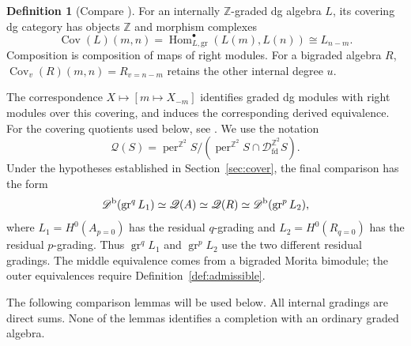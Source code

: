\documentclass[12pt,a4paper,english,reqno]{amsart}
\theoremstyle{plain}
\theoremstyle{definition}
\newtheorem{dfn*}[thm]{Definition}
\numberwithin{equation}{section}
\def\Hom{\operatorname{Hom}}
\def\Db{{\mathcal D}^{\text{\rm b}}}
\def\perf{\operatorname{per}}
\def\calD{{\mathcal D}}
\def\bbZ{{\mathbb Z}}
\def\iso{\cong}
\def\gr{\operatorname{gr}}
\def\Cov{\operatorname{Cov}}
\def\fd{\mathrm{fd}}
\begin{document}
\begin{dfn*}[{Compare \cite[Section 2.b]{AP}}]\label{def:covering}
For an internally $\bbZ$-graded dg algebra $L$, its covering dg
category has objects $\bbZ$ and morphism complexes
\[
 \Cov(L)(m,n)=\Hom^\bullet_{L,\mathrm{gr}}(L(m),L(n))\iso L_{n-m}.
\]
Composition is composition of maps of right modules. For a bigraded
algebra $R$, $\Cov_v(R)(m,n)=R_{v=n-m}$ retains the other internal
degree $u$.
\end{dfn*}

The correspondence $X\mapsto[m\mapsto X_{-m}]$ identifies graded
dg modules with right modules over this covering, and induces the
corresponding derived equivalence. For the covering quotients used
below, see \cite[Appendix A, Setting A.5 and Theorem A.7]{Han}.
We use the notation
\[
 \mathcal Q(S)=\perf^{\bbZ^2}S/
       (\perf^{\bbZ^2}S\cap\calD^{\bbZ^2}_{\fd}S).
\]
Under the hypotheses established in Section~\ref{sec:cover}, the final
comparison has the form
\[
 \Db(\gr^qL_1)\simeq\mathcal Q(A)\simeq\mathcal Q(R)
       \simeq\Db(\gr^pL_2),
\]
where $L_1=H^0(A_{p=0})$ has the residual $q$-grading and
$L_2=H^0(R_{q=0})$ has the residual $p$-grading.
Thus $\gr^qL_1$ and $\gr^pL_2$ use the two different residual gradings.
The middle equivalence comes from a bigraded Morita bimodule; the
outer equivalences require Definition~\ref{def:admissible}.

\label{subsec:conventions}
The following comparison lemmas will be used below. All internal gradings
are direct sums. None of the lemmas identifies a completion with an
ordinary graded algebra.
\end{document}
